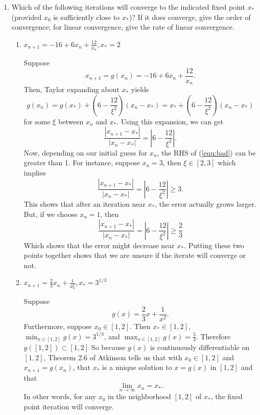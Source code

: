 \documentclass[a4paper,12pt]{article}
\newcommand{\abs}[1]{\left| #1 \right|}
\begin{document}
	\begin{enumerate}[label = \arabic*.]
		\item Which of the following iterations will converge to the indicated fixed point $ x_* $ (provided $ x_0 $ is sufficiently close to $ x_* $)? If it does converge, give the order of convergence; for linear convergence, give the rate of linear convergence.
		
		\begin{enumerate}[label = \roman*.]
			\item $ x_{n+1} = -16 + 6x_n + \frac{12}{x_n}, x_*= 2$
            
            Suppose
            \[
                x_{n+1} = g(x_n) = -16 + 6x_n + \frac{12}{x_n}.
            \]
            Then, Taylor expanding about $ x_* $ yields
            \[
                g(x_n) = g(x_*) + (6 - \frac{12}{\xi^2})(x_n - x_*) = x_* + (6 - \frac{12}{\xi^2})(x_n - x_*)
            \]
            for some $ \xi $ between $ x_n $ and $ x_* $. Using this expansion, we can get
            \begin{equation}
                \frac{\abs{x_{n + 1} - x_*}}{\abs{x_n - x_*}} =\abs{ 6 - \frac{12}{\xi^2}}. \label{equ:bad}
            \end{equation}
            Now, depending on our initial guess for $ x_n $, the RHS of (\ref{equ:bad}) can be greater than 1. For instance, suppose $ x_n = 3 $, then $ \xi \in [2, 3] $ which implies
            \[
               \frac{\abs{x_{n + 1} - x_*}}{\abs{x_n - x_*}} = \abs{ 6 - \frac{12}{\xi^2}} \geq 3.
            \]
            This shows that after an iteration near $ x_* $, the error actually grows larger. But, if we choose $ x_n = 1 $, then 
            \[
                \frac{\abs{x_{n + 1} - x_*}}{\abs{x_n - x_*}} = \abs{ 6 - \frac{12}{\xi^2}} \geq \frac{2}{3}
            \]
            Which shows that the error might decrease near $ x_* $. Putting these two points together shows that we are unsure if the iterate will converge or not.
			
			\item $ x_{n+1} = \frac{2}{3} x_n + \frac{1}{x_n^2}, x_* = 3^{1/3}$
			
			Suppose 
			\[
				g(x) = \frac{2}{3}x + \frac{1}{x^2}.
			\]
			Furthermore, suppose $ x_0 \in [1,2] $. Then $ x_* \in [1,2] $,  $ \min_{x \in [1,2]} g(x) = 3^{1/3} $, and $ \max_{x \in [1,2]}g(x) = \frac{5}{3} $. Therefore $ g([1,2]) \subset [1,2]$ So because $ g(x) $ is continuously differentiable on $ [1,2] $, Theorem 2.6 of Atkinson tells us that with $ x_0 \in [1,2] $ and $ x_{n+1} = g(x_n)$, that $ x_* $ is a unique solution to $ x = g(x) $ in $ [1,2] $ and that
			\[
				\lim_{n \to \infty} x_n = x_*.
			\]
			In other words, for any $ x_0 $ in the neighborhood $ [1,2] $ of $ x_* $, the fixed point iteration will converge.
			

\end{enumerate}
\end{enumerate}
\end{document}
